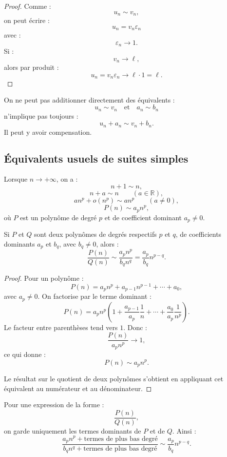 \documentclass[11pt,a4paper]{article}
\newcommand{\R}{\mathbb R}
\begin{document}
\begin{proof}
Comme :
\[
u_n\sim v_n,
\]
on peut écrire :
\[
u_n=v_n\varepsilon_n
\]
avec :
\[
\varepsilon_n\to1.
\]
Si :
\[
v_n\to\ell,
\]
alors par produit :
\[
u_n=v_n\varepsilon_n\to \ell\cdot1=\ell.
\]
\end{proof}

\begin{erreurbox}
On ne peut pas additionner directement des équivalents :
\[
u_n\sim v_n
\quad\text{et}\quad
a_n\sim b_n
\]
n'implique pas toujours :
\[
u_n+a_n\sim v_n+b_n.
\]
Il peut y avoir compensation.
\end{erreurbox}

\subsection{Équivalents usuels de suites simples}

\begin{theorembox}
Lorsque \(n\to+\infty\), on a :
\[
n+1\sim n,
\]
\[
n+a\sim n\qquad (a\in\R),
\]
\[
an^p+o(n^p)\sim an^p
\qquad (a\neq0),
\]
\[
P(n)\sim a_p n^p,
\]
où \(P\) est un polynôme de degré \(p\) et de coefficient dominant \(a_p\neq0\).

Si \(P\) et \(Q\) sont deux polynômes de degrés respectifs \(p\) et \(q\), de coefficients dominants \(a_p\) et \(b_q\), avec \(b_q\neq0\), alors :
\[
\frac{P(n)}{Q(n)}
\sim
\frac{a_p n^p}{b_q n^q}
=
\frac{a_p}{b_q}n^{p-q}.
\]
\end{theorembox}

\begin{proof}
Pour un polynôme :
\[
P(n)=a_p n^p+a_{p-1}n^{p-1}+\cdots+a_0,
\]
avec \(a_p\neq0\). On factorise par le terme dominant :
\[
P(n)=a_p n^p\left(1+\frac{a_{p-1}}{a_p}\frac1n+\cdots+\frac{a_0}{a_p}\frac1{n^p}\right).
\]
Le facteur entre parenthèses tend vers \(1\). Donc :
\[
\frac{P(n)}{a_p n^p}\to1,
\]
ce qui donne :
\[
P(n)\sim a_p n^p.
\]

Le résultat sur le quotient de deux polynômes s'obtient en appliquant cet équivalent au numérateur et au dénominateur.
\end{proof}

\begin{methodbox}
Pour une expression de la forme :
\[
\frac{P(n)}{Q(n)},
\]
on garde uniquement les termes dominants de \(P\) et de \(Q\). Ainsi :
\[
\frac{a_p n^p+\text{termes de plus bas degré}}{b_q n^q+\text{termes de plus bas degré}}
\sim
\frac{a_p}{b_q}n^{p-q}.
\]
\end{methodbox}
\end{document}
